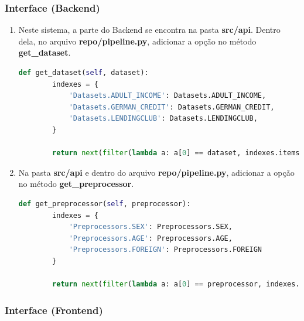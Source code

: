 \documentclass[portugues]{ic-tese}
\begin{document}
\subsubsection{Interface (Backend)}

\begin{enumerate}
\item Neste sistema, a parte do Backend se encontra na pasta \textbf{src/api}. Dentro dela, no arquivo \textbf{repo/pipeline.py}, adicionar a opção no método \textbf{get\_dataset}.

\begin{lstlisting}[language=Python, label=cod:AddDataset]
    def get_dataset(self, dataset):
        indexes = {
            'Datasets.ADULT_INCOME': Datasets.ADULT_INCOME,
            'Datasets.GERMAN_CREDIT': Datasets.GERMAN_CREDIT,
            'Datasets.LENDINGCLUB': Datasets.LENDINGCLUB,
        }

        return next(filter(lambda a: a[0] == dataset, indexes.items()))[1]
\end{lstlisting}

\item Na pasta \textbf{src/api} e dentro do arquivo \textbf{repo/pipeline.py}, adicionar a opção no método \textbf{get\_preprocessor}.

\begin{lstlisting}[language=Python, label=cod:AddDataset]
    def get_preprocessor(self, preprocessor):
        indexes = {
            'Preprocessors.SEX': Preprocessors.SEX,
            'Preprocessors.AGE': Preprocessors.AGE,
            'Preprocessors.FOREIGN': Preprocessors.FOREIGN
        }

        return next(filter(lambda a: a[0] == preprocessor, indexes.items()))[1]
\end{lstlisting}
\end{enumerate}

\subsubsection{Interface (Frontend)}
\end{document}
